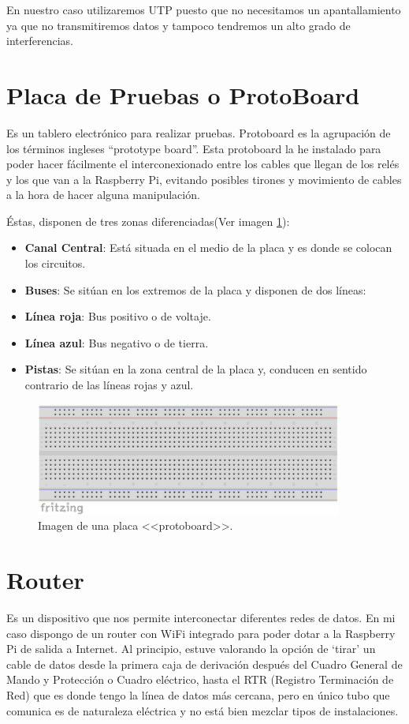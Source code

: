 \begin{itemize}
En nuestro caso utilizaremos UTP puesto que no necesitamos un apantallamiento ya que no transmitiremos datos y tampoco tendremos un alto grado de interferencias.

\section{Placa de Pruebas o ProtoBoard}
Es un tablero electrónico para realizar pruebas. Protoboard es la agrupación de los términos ingleses “prototype board”.
Esta protoboard la he instalado para poder hacer fácilmente el interconexionado entre los cables que llegan de los relés y los que van a la Raspberry Pi, evitando posibles tirones y movimiento de cables a la hora de hacer alguna manipulación.

Éstas, disponen de tres zonas diferenciadas(Ver imagen \ref{Img:Protoboard}):

\begin{itemize}
    \item \textbf{Canal Central}: Está situada en el medio de la placa y es donde se colocan los circuitos.
    \item \textbf{Buses}: Se sitúan en los extremos de la placa y disponen de dos líneas:
    \item \textbf{Línea roja}: Bus positivo o de voltaje.
    \item \textbf{Línea azul}: Bus negativo o de tierra.
    \item \textbf{Pistas}: Se sitúan en la zona central de la placa y, conducen en sentido contrario de las líneas rojas y azul.
\end{itemize}

\begin{figure}
    \centering
    \includegraphics[width=0.9\textwidth]{img/protoboard.pdf}
    \caption{Imagen de una placa <<protoboard>>. } \label{Img:Protoboard}
\end{figure}



\section{Router}
Es un dispositivo que nos permite interconectar diferentes redes de datos. En mi caso dispongo de un router con WiFi integrado para poder dotar a la Raspberry Pi de salida a Internet.
Al principio, estuve valorando la opción de ‘tirar’ un cable de datos desde la primera caja de derivación después del Cuadro General de Mando y Protección o Cuadro eléctrico, hasta el RTR (Registro Terminación de Red) que es donde tengo la línea de datos más cercana, pero en único tubo que comunica es de naturaleza eléctrica y no está bien mezclar tipos de instalaciones.


\end{itemize}
